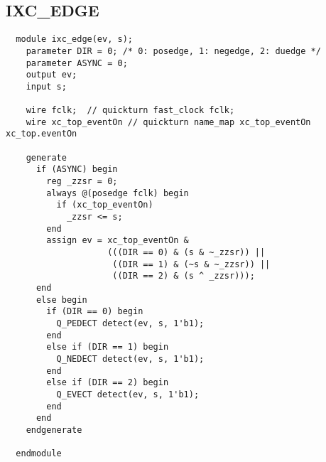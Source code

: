 \documentclass{note}
\begin{document}
\subsection{IXC\_EDGE}
\begin{verbatim}
  module ixc_edge(ev, s);
    parameter DIR = 0; /* 0: posedge, 1: negedge, 2: duedge */
    parameter ASYNC = 0;
    output ev;
    input s;

    wire fclk;  // quickturn fast_clock fclk;
    wire xc_top_eventOn // quickturn name_map xc_top_eventOn xc_top.eventOn
    
    generate
      if (ASYNC) begin
        reg _zzsr = 0;
        always @(posedge fclk) begin
          if (xc_top_eventOn) 
            _zzsr <= s;
        end
        assign ev = xc_top_eventOn &
                    (((DIR == 0) & (s & ~_zzsr)) ||          
                     ((DIR == 1) & (~s & ~_zzsr)) ||          
                     ((DIR == 2) & (s ^ _zzsr)));
      end 
      else begin
        if (DIR == 0) begin
          Q_PEDECT detect(ev, s, 1'b1);
        end
        else if (DIR == 1) begin
          Q_NEDECT detect(ev, s, 1'b1);
        end
        else if (DIR == 2) begin
          Q_EVECT detect(ev, s, 1'b1);
        end
      end
    endgenerate
    
  endmodule
\end{verbatim}
\end{document}
